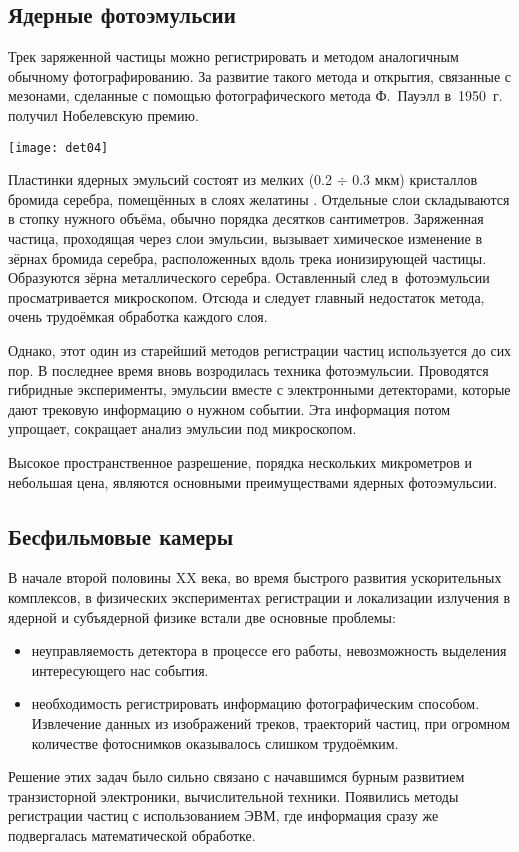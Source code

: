 
\vspace{0.6cm}
\subsection{Ядерные фотоэмульсии}
Трек заряженной частицы можно регистрировать и методом аналогичным
обычному фотографированию. За развитие такого метода и открытия,
связанные с мезонами, сделанные с помощью фотографического метода
Ф.~Пауэлл в~1950~г. получил Нобелевскую премию.
\begin{floatingfigure}[r]{5.0cm}
  \hspace{-0.6cm}
  \texttt{[image: det04]}
\end{floatingfigure}
Пластинки ядерных эмульсий состоят из мелких (0.2 $\div$ 0.3 мкм)
кристаллов бромида серебра, помещённых в слоях желатины \cite{nak:06}.
Отдельные слои складываются в стопку нужного объёма, обычно порядка
десятков сантиметров. Заряженная частица, проходящая через слои эмульсии,
вызывает химическое изменение в зёрнах бромида серебра, расположенных
вдоль трека ионизирующей частицы. Образуются зёрна металлического
серебра. Оставленный след в~фотоэмульсии просматривается микроскопом.
Отсюда и следует главный недостаток метода, очень трудоёмкая обработка
каждого слоя.

Однако, этот один из старейший методов регистрации частиц используется
до сих пор. В последнее время вновь возродилась техника фотоэмульсии.
Проводятся гибридные эксперименты, эмульсии вместе с электронными 
детекторами, которые дают трековую информацию о нужном событии. Эта
информация потом упрощает, сокращает анализ эмульсии под микроскопом.

Высокое пространственное разрешение, порядка нескольких микрометров и
небольшая цена, являются основными преимуществами ядерных фотоэмульсии.

\subsection{Бесфильмовые камеры}
В начале второй половины XX века, во время быстрого развития ускорительных
комплексов, в физических экспериментах регистрации и локализации излучения
в ядерной и субъядерной физике встали две основные проблемы:
\begin{itemize}
\item неуправляемость детектора в процессе его работы, невозможность
  выделения интересующего нас события.
\item необходимость регистрировать информацию фотографическим
  способом. Извлечение данных из изображений треков, траекторий частиц,
  при огромном количестве фотоснимков оказывалось слишком трудоёмким.
\end{itemize}
Решение этих задач было сильно связано с начавшимся бурным развитием
транзисторной электроники, вычислительной техники. Появились методы
регистрации частиц с использованием ЭВМ, где информация сразу же
подвергалась математической обработке.

